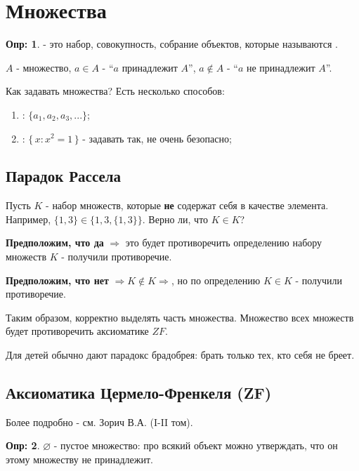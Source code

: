 \documentclass[12pt]{article}
\theoremstyle{definition}
\newtheorem{defn}{Опр:}
\begin{document}
\section*{Множества}

\begin{defn}
	 - это набор, совокупность, собрание объектов, которые называются .
\end{defn}

$A$ - множество, $a \in A$ - ``$a$ принадлежит $A$'', $a \notin A$ - ``$a$ не принадлежит $A$''.

Как задавать множества? Есть несколько способов:
\begin{enumerate}[label={(\arabic*)}]
	\item {}: $\{a_1, a_2, a_3, ...\}$;
	\item {}: $\{\,x \colon x^2 =1 \,\}$ - задавать так, не очень безопасно;
\end{enumerate}

\subsection*{Парадок Рассела}

Пусть $K$ - набор множеств, которые \textbf{не} содержат себя в качестве элемента.
Например, $\{1, 3\} \in \{1, 3, \{1,3\}\}$. Верно ли, что $K \in K$?

\textbf{Предположим, что да} $\Rightarrow$ это будет противоречить определению набору множеств $K$ - получили противоречие.

\textbf{Предположим, что нет} $\Rightarrow K \notin K \Rightarrow$, но по определению $K \in K$ - получили противоречие.

Таким образом, корректно выделять часть множества. Множество всех множеств будет противоречить аксиоматике $ZF$.

Для детей обычно дают парадокс брадобрея: брать только тех, кто себя не бреет.

\subsection*{Аксиоматика Цермело-Френкеля (ZF)}

Более подробно - см. Зорич В.А. (I-II том).

\begin{defn}
	$\varnothing$ - пустое множество: про всякий объект можно утверждать, что он этому множеству не принадлежит.
\end{defn}
\end{document}
